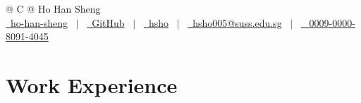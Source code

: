 \documentclass[a4paper,12pt]{article}
\begin{document}
\pagestyle{empty} 



\begin{tabularx}{\linewidth}{@{} C @{}}
\Huge{Ho Han Sheng} \\[7.5pt]
\href{https://ho-han-sheng.github.io}{\raisebox{-0.05\height}\faGlobe\ ho-han-sheng} \ $|$ \ 
\href{https://github.com/ho-han-sheng}{\raisebox{-0.05\height}\faGithub\ GitHub} \ $|$ \ 
\href{https://linkedin.com/in/hsho}{\raisebox{-0.05\height}\faLinkedin\ hsho} \ $|$ \ 
\href{mailto:hsho005@suss.edu.sg}{\raisebox{-0.05\height}\faEnvelope \ hsho005@suss.edu.sg} \ $|$ \
\href{https://orcid.org/0009-0000-8091-4045}{\raisebox{-0.05\height}\faOrcid
 \ 0009-0000-8091-4045} \\
\end{tabularx}


\section{Work Experience}
\end{document}
